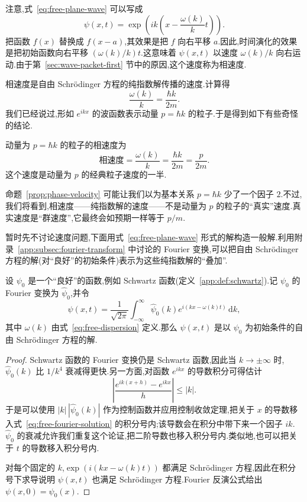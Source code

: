 注意,式~\eqref{eq:free-plane-wave} 可以写成
\[
\psi(x,t)=\exp\left(ik\left(x-\frac{\omega(k)}{k}t\right)\right).
\]
把函数 \(f(x)\) 替换成 \(f(x-a)\),其效果是把 \(f\) 向右平移 \(a\).因此,时间演化的效果是把初始函数向右平移 \((\omega(k)/k)t\).这意味着 \(\psi(x,t)\) 以速度 \(\omega(k)/k\) 向右运动.由于第~\ref{sec:wave-packet-first} 节中的原因,这个速度称为相速度.

相速度是自由 Schrödinger 方程的纯指数解传播的速度.计算得
\[
\frac{\omega(k)}{k}=\frac{\hbar k}{2m}.
\]
我们已经说过,形如 \(e^{ikx}\) 的波函数表示动量 \(p=\hbar k\) 的粒子.于是得到如下有些奇怪的结论.

\begin{proposition}[相速度]\label{prop:phase-velocity}
动量为 \(p=\hbar k\) 的粒子的相速度为
\[
\text{相速度}=\frac{\omega(k)}{k}
=\frac{\hbar k}{2m}
=\frac{p}{2m}.
\]
这个速度是动量为 \(p\) 的经典粒子速度的一半.
\end{proposition}

命题~\ref{prop:phase-velocity} 可能让我们以为基本关系 \(p=\hbar k\) 少了一个因子 \(2\).不过,我们将看到,相速度——纯指数解的速度——不是动量为 \(p\) 的粒子的“真实”速度.真实速度是“群速度”,它最终会如预期一样等于 \(p/m\).

暂时先不讨论速度问题,下面用式~\eqref{eq:free-plane-wave} 形式的解构造一般解.利用附录~\ref{app:subsec:fourier-transform} 中讨论的 Fourier 变换,可以把自由 Schrödinger 方程的解(对“良好”的初始条件)表示为这些纯指数解的“叠加”.

\begin{proposition}\label{prop:free-fourier-solution}
设 \(\psi_{0}\) 是一个“良好”的函数,例如 Schwartz 函数(定义~\ref{app:def:schwartz}).记 \(\psi_{0}\) 的 Fourier 变换为 \(\widehat{\psi}_{0}\),并令
\begin{equation}
\psi(x,t)=\frac{1}{\sqrt{2\pi}}\int_{-\infty}^{\infty}
\widehat{\psi}_{0}(k)e^{i(kx-\omega(k)t)}\,\mathrm{d}k,
\label{eq:free-fourier-solution}
\end{equation}
其中 \(\omega(k)\) 由式~\eqref{eq:free-dispersion} 定义.那么 \(\psi(x,t)\) 是以 \(\psi_{0}\) 为初始条件的自由 Schrödinger 方程的解.
\end{proposition}

\begin{proof}
Schwartz 函数的 Fourier 变换仍是 Schwartz 函数,因此当 \(k\to\pm\infty\) 时,\(\widehat{\psi}_{0}(k)\) 比 \(1/k^{4}\) 衰减得更快.另一方面,对函数 \(e^{ikx}\) 的导数积分可得估计
\[
\left|\frac{e^{ik(x+h)}-e^{ikx}}{h}\right|\le |k|.
\]
于是可以使用 \(|k|\,|\widehat{\psi}_{0}(k)|\) 作为控制函数并应用控制收敛定理,把关于 \(x\) 的导数移入式~\eqref{eq:free-fourier-solution} 的积分号内;该导数会在积分中带下来一个因子 \(ik\).\(\widehat{\psi}_{0}\) 的衰减允许我们重复这个论证,把二阶导数也移入积分号内.类似地,也可以把关于 \(t\) 的导数移入积分号内.

对每个固定的 \(k\),\(\exp(i(kx-\omega(k)t))\) 都满足 Schrödinger 方程,因此在积分号下求导说明 \(\psi(x,t)\) 也满足 Schrödinger 方程.Fourier 反演公式给出 \(\psi(x,0)=\psi_{0}(x)\).
\end{proof}

